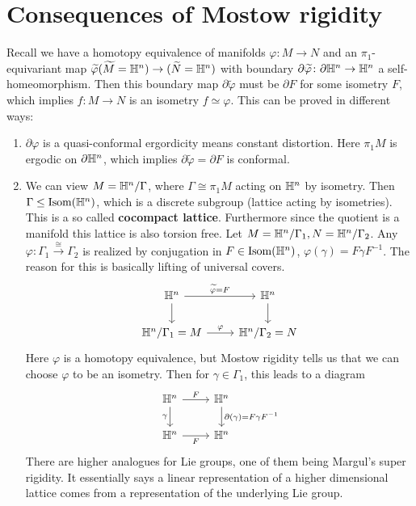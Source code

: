 \section{Consequences of Mostow rigidity} 
Recall we have a homotopy equivalence of manifolds $\varphi  \colon M \to N$ and an $\pi_1$-equivariant map $\widetilde \varphi (\widetilde M= \mathbb{H}^n)  \to  (\widetilde N=\mathbb{H}^n)   $ with boundary $\partial  \widetilde \varphi  \colon \partial \mathbb{H}^n  \to \mathbb{H}^n $ a self-homeomorphism. Then this boundary map $\partial \widetilde \varphi $ must be $\partial F$ for some isometry $F$, which implies $f \colon M \to N$ is an isometry $f \simeq \varphi $. This can be proved in different ways:
\begin{enumerate}[label=(\arabic*)]
\setlength\itemsep{-.2em}
    \item $\partial \varphi $ is a quasi-conformal ergordicity means constant distortion. Here $\pi_1 M$ is ergodic on $\partial \mathbb{H}^n $, which implies $\partial  \widetilde \varphi =\partial F$ is conformal.
    \item We can view $M=\mathbb{H}^n  /\Gamma $, where $\Gamma \cong \pi_1 M $ acting on $\mathbb{H}^n $ by isometry. Then $\Gamma \leq \mathrm{Isom}(\mathbb{H}^n )$, which is a discrete subgroup (lattice acting by isometries). This is a so called \textbf{cocompact lattice}. Furthermore since the quotient is a manifold this lattice is also torsion free. Let $M=\mathbb{H}^n /\Gamma_1,N=\mathbb{H}^n  / \Gamma_2$. Any $\varphi  \colon \Gamma_1 \xrightarrow{\cong} \Gamma_2 $ is realized by conjugation in $F \in \mathrm{Isom}(\mathbb{H}^n )$, $\varphi (\gamma )=F \gamma F^{-1}$. The reason for this is basically lifting of universal covers. \[
   \begin{tikzcd}
\H^n \arrow[r, "\widetilde \varphi=F"] \arrow[d] & \H^n \arrow[d]    \\
\H^n/\Gamma_1=M \arrow[r, "\varphi"]             & \H^n / \Gamma_2=N
\end{tikzcd} 
    \] Here $\varphi $ is a homotopy equivalence, but Mostow rigidity tells us that we can choose $\varphi $ to be an isometry. Then for $\gamma  \in\Gamma_1$, this leads to a diagram \[
    \begin{tikzcd}
\H^n \arrow[r, "F"] \arrow[d, "\gamma"'] & \H^n \arrow[d, "\partial(\gamma)=F\gamma F^{-1}"] \\
\H^n \arrow[r, "F"']                     & \H^n                                             
\end{tikzcd}
    \] There are higher analogues for Lie groups, one of them being Margul's super rigidity. It essentially says a linear representation of a higher dimensional lattice comes from a representation of the underlying Lie group.
\end{enumerate}


